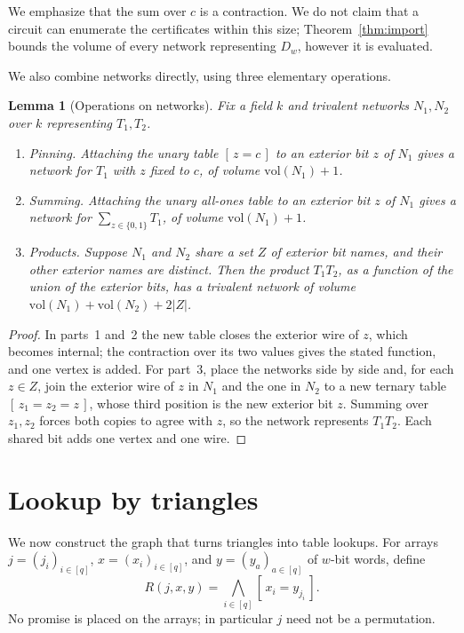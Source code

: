 \documentclass[11pt]{article}
\newtheorem{lemma}[theorem]{Lemma}
\theoremstyle{definition}
\theoremstyle{remark}
\newcommand{\vol}{\mathrm{vol}}
\newcommand{\ind}[1]{[\,#1\,]}
\begin{document}
We emphasize that the sum over $c$ is a contraction. We do not claim that a
circuit can enumerate the certificates within this size;
Theorem~\ref{thm:import} bounds the volume of every network representing
$D_w$, however it is evaluated.

We also combine networks directly, using three elementary operations.

\begin{lemma}[Operations on networks]\label{lem:ops}
Fix a field $k$ and trivalent networks $N_1,N_2$ over $k$ representing
$T_1,T_2$.
\begin{enumerate}
\item \emph{Pinning.} Attaching the unary table $\ind{z=c}$ to an exterior
bit $z$ of $N_1$ gives a network for $T_1$ with $z$ fixed to $c$, of volume
$\vol(N_1)+1$.
\item \emph{Summing.} Attaching the unary all-ones table to an exterior bit
$z$ of $N_1$ gives a network for $\sum_{z\in\{0,1\}}T_1$, of volume
$\vol(N_1)+1$.
\item \emph{Products.} Suppose $N_1$ and $N_2$ share a set $Z$ of exterior
bit names, and their other exterior names are distinct. Then the product
$T_1T_2$, as a function of the union of the exterior bits, has a trivalent
network of volume $\vol(N_1)+\vol(N_2)+2|Z|$.
\end{enumerate}
\end{lemma}
\begin{proof}
In parts~1 and~2 the new table closes the exterior wire of $z$, which
becomes internal; the contraction over its two values gives the stated
function, and one vertex is added. For part~3, place the networks side by
side and, for each $z\in Z$, join the exterior wire of $z$ in $N_1$ and
the one in $N_2$ to a new ternary table $\ind{z_1=z_2=z}$, whose third
position is the new exterior bit $z$. Summing over $z_1,z_2$ forces both
copies to agree with $z$, so the network represents $T_1T_2$. Each shared
bit adds one vertex and one wire.
\end{proof}

\section{Lookup by triangles}\label{sec:lookup}

We now construct the graph that turns triangles into table lookups. For
arrays $j=(j_i)_{i\in[q]}$, $x=(x_i)_{i\in[q]}$, and $y=(y_a)_{a\in[q]}$
of $w$-bit words, define
\[
R(j,x,y)=\bigwedge_{i\in[q]}\ind{x_i=y_{j_i}}.
\]
No promise is placed on the arrays; in particular $j$ need not be a
permutation.
\end{document}
